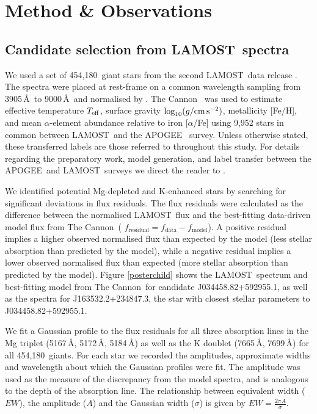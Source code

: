 \documentclass[a4paper,fleqn,usenatbib]{mnras}
\newcommand{\LamostGiants}{454,180}
\newcommand{\project}[1]{#1}
\newcommand{\lamost}{\project{LAMOST}}
\newcommand{\apogee}{\project{APOGEE}}
\newcommand{\tc}{\project{The Cannon}}
\newcommand{\teff}{T_{\rm eff}}
\newcommand{\logg}{\log_{10}(g/{\rm cm\,s}^{-2})}
\begin{document}
\section{Method \& Observations}
\label{sec:method}
\subsection{Candidate selection from \lamost\ spectra}
We used a set of \LamostGiants\ giant stars from the second \lamost\ data release \citep{luo2016vizier}. The spectra were placed at rest-frame on a common wavelength sampling from 3905\,\AA\ to 9000\,\AA\ and normalised by \citet{ho2017}. \tc\ \citep{ness2016,ho2017} was used to estimate effective temperature $\teff$, surface gravity $\logg$, metallicity [Fe/H], and mean $\alpha$-element abundance relative to iron [$\alpha$/Fe] using 9,952 stars in common between \lamost\ and the \apogee\ \citep{alam2015} survey. Unless otherwise stated, these transferred labels are those referred to throughout this study. For details regarding the preparatory work, model generation, and label transfer between the \apogee\ and \lamost\ surveys we direct the reader to \citet{ho2017}. 

We identified potential Mg-depleted and K-enhanced stars by searching for significant deviations in flux residuals. The flux residuals were calculated as the difference between the normalised \lamost\ flux and the best-fitting data-driven model flux from \tc\ ( $f_{\textrm{residual}} = f_{\textrm{data}} - f_{\textrm{model}}$). A positive residual implies a higher observed normalised flux than expected by the model (less stellar absorption than predicted by the model), while a negative residual implies a lower observed normalised flux than expected (more stellar absorption than predicted by the model). Figure \ref{posterchild} shows the \lamost\ spectrum and best-fitting model from \tc\ for candidate J034458.82+592955.1, as well as the spectra for J163532.2+234847.3, the star with closest stellar parameters to J034458.82+592955.1. 

We fit a Gaussian profile to the flux residuals for all three absorption lines in the Mg triplet (5167\,\AA, 5172\,\AA, 5184\,\AA) as well as the K doublet (7665\,\AA, 7699\,\AA) for all \LamostGiants\ giants. For each star we recorded the amplitudes, approximate widths and wavelength about which the Gaussian profiles were fit. The amplitude was used as the measure of the discrepancy from the model spectra, and is analogous to the depth of the absorption line. The relationship between equivalent width ($EW$), the amplitude ($A$) and the Gaussian width ($\sigma$) is given by $EW=\frac{2\pi A}{\sigma}$.
\end{document}
